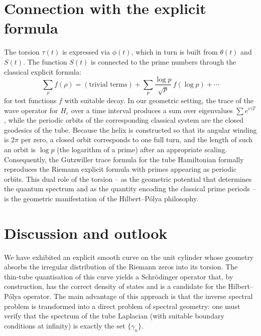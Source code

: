 \documentclass[12pt,a4paper]{article}
\newcommand{\eps}{\varepsilon}
\begin{document}
\section{Connection with the explicit formula}
The torsion $\tau(t)$ is expressed via $\phi(t)$, which in turn is built from $\theta(t)$ and $S(t)$. The function $S(t)$ is connected to the prime numbers through the classical explicit formula:
\[
  \sum_{\rho} f(\rho) = (\text{trivial terms}) + \sum_{p}\frac{\log p}{\sqrt{p}}\, f(\log p) + \cdots
\]
for test functions $f$ with suitable decay. In our geometric setting, the trace of the wave operator for $H_{\eps}$ over a time interval produces a sum over eigenvalues $\sum e^{i\gamma T}$, while the periodic orbits of the corresponding classical system are the closed geodesics of the tube. Because the helix is constructed so that its angular winding is $2\pi$ per zero, a closed orbit corresponds to one full turn, and the length of such an orbit is $\log p$ (the logarithm of a prime) after an appropriate scaling. Consequently, the Gutzwiller trace formula for the tube Hamiltonian formally reproduces the Riemann explicit formula with primes appearing as periodic orbits. This dual role of the torsion – as the geometric potential that determines the quantum spectrum and as the quantity encoding the classical prime periods – is the geometric manifestation of the Hilbert–P\'olya philosophy.

\section{Discussion and outlook}
We have exhibited an explicit smooth curve on the unit cylinder whose geometry absorbs the irregular distribution of the Riemann zeros into its torsion. The thin‑tube quantisation of this curve yields a Schr\"odinger operator that, by construction, has the correct density of states and is a candidate for the Hilbert–P\'olya operator. The main advantage of this approach is that the inverse spectral problem is transformed into a direct problem of spectral geometry: one must verify that the spectrum of the tube Laplacian (with suitable boundary conditions at infinity) is exactly the set $\{\gamma_n\}$.
\end{document}

